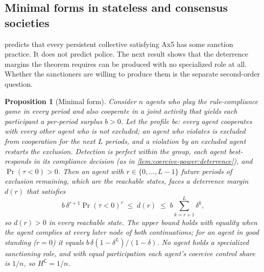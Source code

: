 \documentclass[11pt,letterpaper]{article}
\newtheorem{proposition}[theorem]{Proposition}
\theoremstyle{definition}
\theoremstyle{remark}
\newcommand{\pC}{\mathsf{C}}
\renewcommand{\Pr}{\operatorname{Pr}}
\begin{document}
\subsection{Minimal forms in stateless and consensus societies}
\label{sec:minimal}

 predicts that every persistent collective satisfying Ax5 has some sanction practice. It does not predict police. The next result shows that the deterrence margins the theorem requires can be produced with no specialized role at all. Whether the sanctioners are willing to produce them is the separate second-order question.

\begin{proposition}[Minimal form]
\label{prop:coercive-power:minimal-form}
Consider $n$ agents who play the rule-compliance game in every period and also cooperate in a joint activity that yields each participant a per-period surplus $b > 0$. Let the profile be: every agent cooperates with every other agent who is not excluded; an agent who violates is excluded from cooperation for the next $L$ periods, and a violation by an excluded agent restarts the exclusion. Detection is perfect within the group, each agent best-responds in its compliance decision (as in \cref{lem:coercive-power:deterrence}), and $\Pr(\tau < 0) > 0$. Then an agent with $r \in \{0, \dots, L-1\}$ future periods of exclusion remaining, which are the reachable states, faces a deterrence margin $d(r)$ that satisfies
\[
b\,\delta^{r+1}\Pr(\tau < 0)^{r} \;\le\; d(r) \;\le\; b \sum_{k=r+1}^{L} \delta^k ,
\]
so $d(r) > 0$ in every reachable state. The upper bound holds with equality when the agent complies at every later node of both continuations; for an agent in good standing ($r = 0$) it equals $b\,\delta(1-\delta^L)/(1-\delta)$. No agent holds a specialized sanctioning role, and with equal participation each agent's coercive control share is $1/n$, so $H^{\pC} = 1/n$.
\end{proposition}
\end{document}
